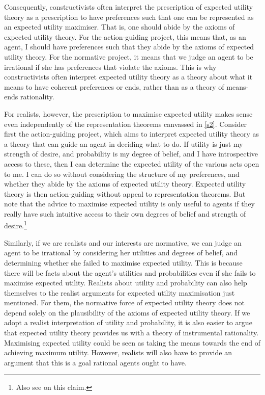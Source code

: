 Consequently, constructivists often interpret the prescription of expected utility theory as a prescription to have preferences such that one can be represented as an expected utility maximiser. That is, one should abide by the axioms of expected utility theory. For the action-guiding project, this means that, as an agent, I should have preferences such that they abide by the axioms of expected utility theory. For the normative project, it means that we judge an agent to be irrational if she has preferences that violate the axioms. This is why constructivists often interpret expected utility theory as a theory about what it means to have coherent preferences or ends, rather than as a theory of means-ends rationality.

For realists, however, the prescription to maximise expected utility makes sense even independently of the representation theorems canvassed in \autoref{s2}. Consider first the action-guiding project, which aims to interpret expected utility theory as a theory that can guide an agent in deciding what to do. If utility is just my strength of desire, and probability is my degree of belief, and I have introspective access to these, then I can determine the expected utility of the various acts open to me. I can do so without considering the structure of my preferences, and whether they abide by the axioms of expected utility theory. Expected utility theory is then action-guiding without appeal to representation theorems. But note that the advice to maximise expected utility is only useful to agents if they really have such intuitive access to their own degrees of belief and strength of desire.\footnote{Also see \citet{Bermudez2009} on this claim.}

Similarly, if we are realists and our interests are normative, we can judge an agent to be irrational by considering her utilities and degrees of belief, and determining whether she failed to maximise expected utility. This is because there will be facts about the agent's utilities and probabilities even if she fails to maximise expected utility. Realists about utility and probability can also help themselves to the realist arguments for expected utility maximisation just mentioned. For them, the normative force of expected utility theory does not depend solely on the plausibility of the axioms of expected utility theory. If we adopt a realist interpretation of utility and probability, it is also easier to argue that expected utility theory provides us with a theory of instrumental rationality. Maximising expected utility could be seen as taking the means towards the end of achieving maximum utility. However, realists will also have to provide an argument that this is a goal rational agents ought to have.

